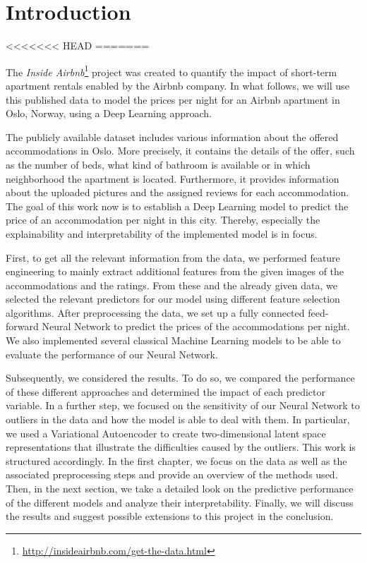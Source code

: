 \section{Introduction}

<<<<<<< HEAD
=======

The \emph{Inside Airbnb}\footnote{\url{http://insideairbnb.com/get-the-data.html}} project \citep{cox2022} was created to quantify the impact of short-term apartment rentals enabled by the Airbnb company.
In what follows, we will use this published data to model the prices per night for an Airbnb apartment in Oslo, Norway, using a Deep Learning approach.

The publicly available dataset includes various information about the offered accommodations in Oslo.
More precisely, it contains the details of the offer, such as the number of beds, what kind of bathroom is available or in which neighborhood the apartment is located.
Furthermore, it provides information about the uploaded pictures and the assigned reviews for each accommodation.
The goal of this work now is to establish a Deep Learning model to predict the price of an accommodation per night in this city.
Thereby, especially the explainability and interpretability of the implemented model is in focus.

First, to get all the relevant information from the data, we performed feature engineering to mainly extract additional features from the given images of the accommodations and the ratings.
From these and the already given data, we selected the relevant predictors for our model using different feature selection algorithms.
After preprocessing the data, we set up a fully connected feed-forward Neural Network to predict the prices of the accommodations per night.
We also implemented several classical Machine Learning models to be able to evaluate the performance of our Neural Network.

Subsequently, we considered the results.
To do so, we compared the performance of these different approaches and determined the impact of each predictor variable.
In a further step, we focused on the sensitivity of our Neural Network to outliers in the data and how the model is able to deal with them.
In particular, we used a Variational Autoencoder to create two-dimensional latent space representations that illustrate the difficulties caused by the outliers.
This work is structured accordingly.
In the first chapter, we focus on the data as well as the associated preprocessing steps and provide an overview of the methods used.
Then, in the next section, we take a detailed look on the predictive performance of the different models and analyze their interpretability.
Finally, we will discuss the results and suggest possible extensions to this project in the conclusion.

